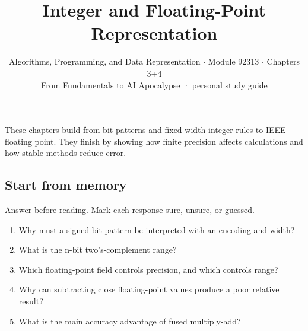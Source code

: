 \documentclass[11pt]{article}
\title{\sffamily\bfseries\color{FAUblue}Integer and Floating-Point Representation}
\author{Algorithms, Programming, and Data Representation \ensuremath{\cdot} Module 92313 \ensuremath{\cdot} Chapters 3+4\\[2pt]\small From Fundamentals to AI Apocalypse · personal study guide}
\date{}
\begin{document}
\maketitle
\begingroup\footnotesize\setlength{\parskip}{0pt}\tableofcontents\endgroup
\clearpage

{\large These chapters build from bit patterns and fixed-width integer rules to IEEE floating point. They finish by showing how finite precision affects calculations and how stable methods reduce error.}


\begin{keepsection}
\section{Start from memory}

Answer before reading. Mark each response sure, unsure, or guessed.

\begin{enumerate}
\item Why must a signed bit pattern be interpreted with an encoding and width?
\item What is the n-bit two’s-complement range?
\item Which floating-point field controls precision, and which controls range?
\item Why can subtracting close floating-point values produce a poor relative result?
\item What is the main accuracy advantage of fused multiply-add?
\end{enumerate}

\end{keepsection}
\end{document}
